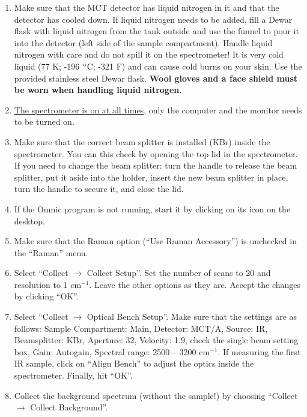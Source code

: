 \documentclass[byrevtex,amssymb,aps,pra,floatfix,letterpaper]{revtex4}
\begin{document}
\begin{enumerate}
\item Make sure that the MCT detector has liquid nitrogen in it and that the detector has cooled down. If liquid nitrogen needs to be added, fill a Dewar flask with liquid nitrogen from the tank outside and use the funnel to pour it into the detector (left side of the sample compartment). Handle liquid nitrogen with care and do not spill it on the spectrometer! It is very cold liquid (77 K; -196 $^\textnormal{o}$C; -321 F) and can cause cold burns on your skin. Use the provided stainless steel Dewar flask. \textbf{Wool gloves and a face shield must be worn when handling liquid nitrogen.}

\item \underline{The spectrometer is on at all times}, only the computer and the monitor needs to be turned on.

\item Make sure that the correct beam splitter is installed (KBr) inside the spectrometer. You can this check by opening the top lid in the spectrometer. If you need to change the beam splitter: turn the handle to release the beam splitter, put it aside into the holder, insert the new beam splitter in place, turn the handle to secure it, and close the lid.

\item If the Omnic program is not running, start it by clicking on its icon on the desktop.

\item Make sure that the Raman option (``Use Raman Accessory'') is unchecked in the ``Raman'' menu.

\item Select ``Collect $\rightarrow$ Collect Setup''. Set the number of scans to 20 and resolution to 1 cm$^{-1}$. Leave the other options as they are. Accept the changes by clicking ``OK''.

\item Select ``Collect $\rightarrow$ Optical Bench Setup''. Make sure that the settings are as follows: Sample Compartment: Main, Detector: MCT/A, Source: IR, Beamsplitter: KBr, Aperture: 32, Velocity: 1.9, check the single beam setting box, Gain: Autogain, Spectral range: 2500 -- 3200 cm$^{-1}$. If measuring the first IR sample, click on ``Align Bench'' to adjust the optics inside the spectrometer. Finally, hit ``OK''.

\item Collect the background spectrum (without the sample!) by choosing ``Collect $\rightarrow$ Collect Background''.


\end{enumerate}
\end{document}
